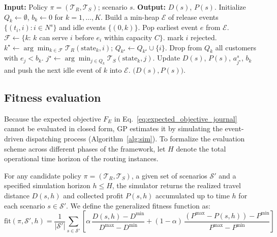 \documentclass[pdflatex]{sn-jnl}
\begin{document}
\begin{algorithm}
\caption{Event-driven dispatching simulator}
\label{alg:sim}
\begin{algorithmic}[1]
\State \textbf{Input:} Policy $\pi=(\mathcal{T}_R,\mathcal{T}_S)$; scenario $s$.
\State \textbf{Output:} $D(s)$, $P(s)$.
\State Initialize $Q_k\leftarrow\emptyset$, $b_k\leftarrow 0$ for
       $k=1,\dots,K$.
\State Build a min-heap $\mathcal{E}$ of release events
       $\{(t_i,i):i\in N^s\}$ and idle events $\{(0,k)\}$.
    \State Pop earliest event $e$ from $\mathcal{E}$.
        \State $\mathcal{F}\leftarrow\{k:\,k$ can serve $i$ before $e_i$
               within capacity $C\}$.
         mark $i$ rejected.
        \Else
            \State $k^\star\leftarrow\arg\min_{k\in\mathcal{F}}
                   \mathcal{T}_R(\mathrm{state}_k,i)$;
                   $Q_{k^\star}\leftarrow Q_{k^\star}\cup\{i\}$.
        \EndIf
        \State Drop from $Q_k$ all customers with $e_j<b_k$.
        \State $j^\star\leftarrow\arg\min_{j\in Q_k}
               \mathcal{T}_S(\mathrm{state}_k,j)$.
        \State Update $D(s)$, $P(s)$, $a_{j^\star}^s$, $b_k$ and push
               the next idle event of $k$ into $\mathcal{E}$.
    \EndIf
\EndWhile
\State \Return $\bigl(D(s),P(s)\bigr)$.
\end{algorithmic}
\end{algorithm}

\subsection{Fitness evaluation} \label{subsec:fitness-method}
Because the expected objective $F_E$ in Eq.~\eqref{eq:expected_objective_journal} cannot be evaluated in closed form, GP estimates it by simulating the event-driven dispatching process (Algorithm~\ref{alg:sim}). To formalize the evaluation scheme across different phases of the framework, let $H$ denote the total operational time horizon of the routing instances.

For any candidate policy $\pi = (\mathcal{T}_R, \mathcal{T}_S)$, a given set of scenarios $\mathcal{S}'$ and a specified simulation horizon $h \le H$, the simulator returns the realized travel distance $D(s, h)$ and collected profit $P(s, h)$ accumulated up to time $h$ for each scenario $s \in \mathcal{S}'$. We define the generalized fitness function as:
$$
\mathrm{fit}(\pi, \mathcal{S}', h) = \frac{1}{|\mathcal{S}'|} \sum_{s \in \mathcal{S}'} \left[ \alpha\,\frac{D(s, h)-D^{\min}}{D^{\max}-D^{\min}} + (1-\alpha)\,\frac{(P^{\max}-P(s, h))-P^{\min}}{P^{\max}-P^{\min}} \right]
$$
\end{document}
